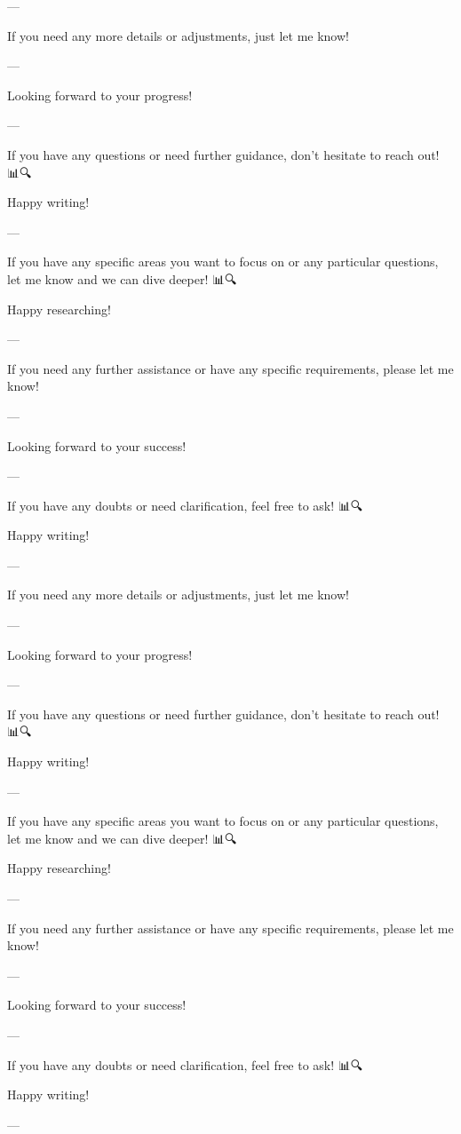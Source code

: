 --- 

If you need any more details or adjustments, just let me know! 🙌

--- 

Looking forward to your progress! 🚀🌟

--- 

If you have any questions or need further guidance, don't hesitate to reach out! 📊🔍

Happy writing! 📝✨

--- 

If you have any specific areas you want to focus on or any particular questions, let me know and we can dive deeper! 📊🔍

Happy researching! 📝🚀

--- 

If you need any further assistance or have any specific requirements, please let me know! 🙌

--- 

Looking forward to your success! 🚀🌟

--- 

If you have any doubts or need clarification, feel free to ask! 📊🔍

Happy writing! 📝✨

--- 

If you need any more details or adjustments, just let me know! 🙌

--- 

Looking forward to your progress! 🚀🌟

--- 

If you have any questions or need further guidance, don't hesitate to reach out! 📊🔍

Happy writing! 📝✨

--- 

If you have any specific areas you want to focus on or any particular questions, let me know and we can dive deeper! 📊🔍

Happy researching! 📝🚀

--- 

If you need any further assistance or have any specific requirements, please let me know! 🙌

--- 

Looking forward to your success! 🚀🌟

--- 

If you have any doubts or need clarification, feel free to ask! 📊🔍

Happy writing! 📝✨

--- 

